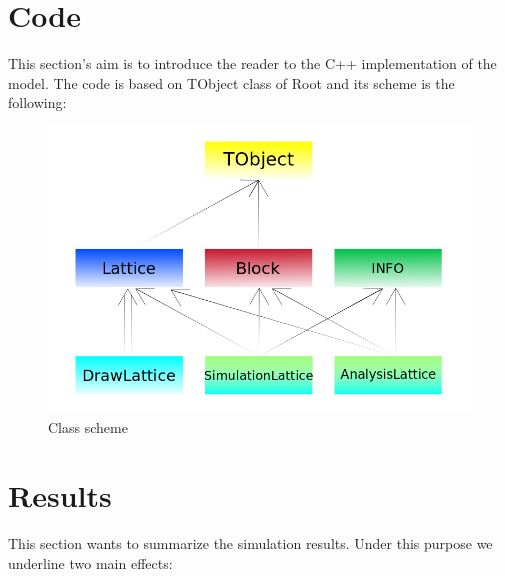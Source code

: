 \documentclass[11pt,a4paper]{article}
\begin{document}
 








\section{Code}
This section's aim is to introduce the reader to the C++ implementation of the model. The code is based on TObject class of Root and its scheme is the following:

\begin{figure}[h!]
  \centering
  \includegraphics[scale=0.45]{img/Schema_classi.png}
  \caption{Class scheme}
\end{figure}



%   












\newpage
\section{Results}
This section wants to summarize the simulation results. Under this purpose we underline two main effects:
\end{document}
